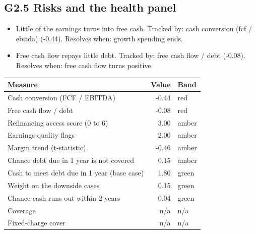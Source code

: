 \documentclass[11pt,a4paper]{article}
\begin{document}
\subsection*{G2.5 Risks and the health panel}
\begin{itemize}\item Little of the earnings turns into free cash. Tracked by: cash conversion (fcf / ebitda) (-0.44). Resolves when: growth spending ends.\item Free cash flow repays little debt. Tracked by: free cash flow / debt (-0.08). Resolves when: free cash flow turns positive.\end{itemize}
\begin{center}\footnotesize\setlength{\tabcolsep}{3.5pt}\begin{tabular}{@{}lrl@{}}\toprule
Measure & Value & Band \\\midrule
Cash conversion (FCF / EBITDA) & -0.44 & \textcolor{bad}{red} \\
Free cash flow / debt & -0.08 & \textcolor{bad}{red} \\
Refinancing access score (0 to 6) & 3.00 & \textcolor{amber}{amber} \\
Earnings-quality flags & 2.00 & \textcolor{amber}{amber} \\
Margin trend (t-statistic) & -0.46 & \textcolor{amber}{amber} \\
Chance debt due in 1 year is not covered & 0.15 & \textcolor{amber}{amber} \\
Cash to meet debt due in 1 year (base case) & 1.80 & \textcolor{good}{green} \\
Weight on the downside cases & 0.15 & \textcolor{good}{green} \\
Chance cash runs out within 2 years & 0.04 & \textcolor{good}{green} \\
Coverage & n/a & n/a \\
Fixed-charge cover & n/a & n/a \\
\bottomrule\end{tabular}\end{center}
\end{document}
